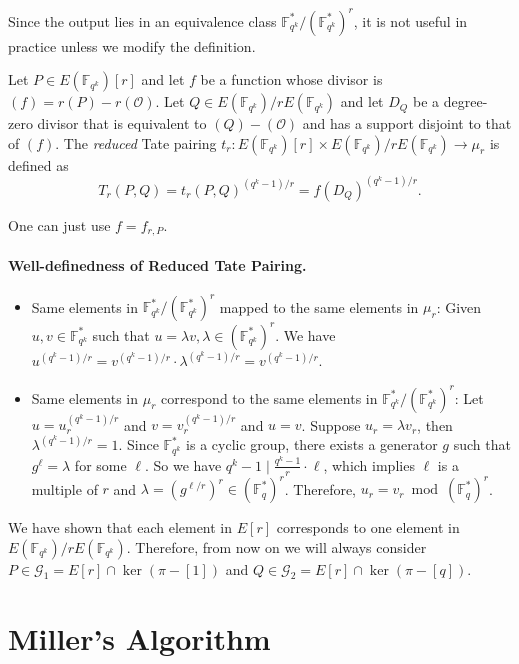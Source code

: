 Since the output lies in an equivalence class $\mathbb{F}_{q^k}^* / (\mathbb{F}_{q^k}^*)^r$, it is not useful in practice unless we modify the definition.

\begin{definition}

Let $P \in E(\mathbb{F}_{q^k})[r]$ and let $f$ be a function whose divisor is $(f) = r(P) - r(\mathcal{O})$.
Let $Q \in E(\mathbb{F}_{q^k}) / rE(\mathbb{F}_{q^k})$ and let $D_Q$ be a degree-zero divisor that is equivalent to $(Q) - (\mathcal{O})$ and has a support disjoint to that of $(f)$.
The \emph{reduced} Tate pairing $t_r: E(\mathbb{F}_{q^k})[r] \times E(\mathbb{F}_{q^k})/rE(\mathbb{F}_{q^k}) \to \mu_r$ is defined as
\[
	T_r(P, Q) = t_r(P, Q)^{(q^k-1)/r} = f(D_Q)^{(q^k-1)/r}.
\]
\end{definition}

One can just use $f = f_{r,P}$.

\paragraph{Well-definedness of Reduced Tate Pairing.}
\begin{itemize}
	\item Same elements in $\mathbb{F}_{q^k}^* / (\mathbb{F}_{q^k}^*)^r$ mapped to the same elements in $\mu_r$:  Given $u, v \in \mathbb{F}_{q^k}^*$ such that $u = \lambda v, \lambda \in (\mathbb{F}_{q^k}^*)^r$. We have $u^{(q^k-1)/r} = v^{(q^k-1)/r} \cdot \lambda^{(q^k-1)/r} = v^{(q^k-1)/r}$.
    \item Same elements in $\mu_r$ correspond to the same elements in $\mathbb{F}_{q^k}^* / (\mathbb{F}_{q^k}^*)^r$: Let $u = u_r^{(q^k-1)/r}$ and $v = v_r^{(q^k-1)/r}$ and $u = v$. Suppose $u_r = \lambda v_r$, then $\lambda^{(q^k-1)/r} = 1$. Since $\mathbb{F}_{q^k}^*$ is a cyclic group, there exists a generator $g$ such that $g^\ell = \lambda$ for some $\ell$. So we have $q^{k}-1 \mid \frac{q^{k}-1}{r} \cdot \ell$, which implies $\ell$ is a multiple of $r$ and $\lambda = (g^{\ell/r})^r \in (\mathbb{F}_{q}^*)^r$. Therefore, $u_r = v_r \bmod (\mathbb{F}_{q}^*)^r$.
\end{itemize}

We have shown that each element in $E[r]$ corresponds to one element in $E(\mathbb{F}_{q^k})/rE(\mathbb{F}_{q^k})$. Therefore, from now on we will always consider $P \in \mathcal{G}_1 = E[r] \cap \ker(\pi - [1])$ and $Q \in \mathcal{G}_2 = E[r] \cap \ker(\pi - [q])$.


\section{Miller's Algorithm}

